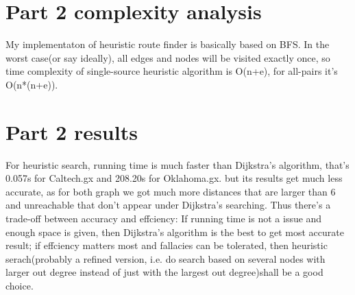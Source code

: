 \documentclass{article}
\begin{document}

\section{Part 2 complexity analysis}
\label{sec:complexity2}
My implementaton of heuristic route finder is basically based on BFS. In the worst case(or say ideally), all edges and nodes will be visited exactly once, so time complexity of single-source heuristic algorithm is O(n+e), for all-pairs it's O(n*(n+e)).

\section{Part 2 results}
\label{sec:part2}
For heuristic search, running time is much faster than Dijkstra's algorithm, that's 0.057s for Caltech.gx and 208.20s for Oklahoma.gx. but its results get much less accurate, as for both graph we got much more distances that are larger than 6 and unreachable that don't appear under Dijkstra's searching. Thus there's a trade-off between accuracy and effciency: If running time is not a issue and enough space is given, then Dijkstra's algorithm is the best to get most accurate result; if effciency matters most and fallacies can be tolerated, then heuristic serach(probably a refined version, i.e. do search based on several nodes with larger out degree instead of just with the largest out degree)shall be a good choice.
\end{document}

